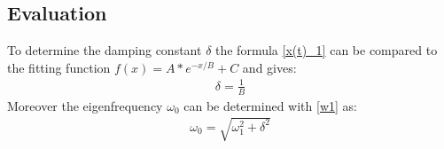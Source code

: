 \subsection{Evaluation}
To determine the damping constant \(\delta\) the formula \eqref{x(t)_1} can be compared to the fitting function \(f(x)=A*e^{-x/B}+C\) and gives:
\begin{align}
\delta = \frac{1}{B}
\end{align}
Moreover the eigenfrequency \(\omega_0\) can be determined with \eqref{w1} as:
\begin{align}
\omega_0 = \sqrt{\omega_1^2 + \delta^2}
\end{align}